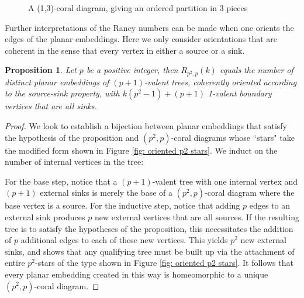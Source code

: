 \documentclass[documentfleqn,12pt]{amsart}
\newtheorem{proposition}[theorem]{Proposition}
\begin{document}
\begin{figure}[h!]
\centering
{}
\caption{A (1,3)-coral diagram, giving an ordered partition in 3 pieces}
\label{fig: (1,r) coral diagram}
\end{figure}

Further interpretations of the Raney numbers can be made when one orients the edges of the planar embeddings.  Here we only consider orientations that are coherent in the sense that every vertex in either a source or a sink.

\begin{proposition}
\label{thm: raney interpretation p=r2}
Let $p$ be a positive integer, then $R_{p^2,p}(k)$ equals the number of distinct planar embeddings of $(p+1)$-valent trees, coherently oriented according to the source-sink property,  with $k(p^2-1) + (p+1)$ 1-valent boundary vertices that are all sinks.
\end{proposition}
\begin{proof}
We look to establish a bijection between planar embeddings that satisfy the hypothesis of the proposition and $(p^2,p)$-coral diagrams whose ``stars" take the modified form shown in Figure \ref{fig: oriented p2 stars}.  We induct on the number of internal vertices in the tree:

For the base step, notice that a $(p+1)$-valent tree with one internal vertex and $(p+1)$ external sinks is merely the base of a $(p^2,p)$-coral diagram where the base vertex is a source.  For the inductive step, notice that adding $p$ edges to an external sink produces $p$ new external vertices that are all sources.  If the resulting tree is to satisfy the hypotheses of the proposition, this necessitates the addition of $p$ additional edges to each of these new vertices.  This yields $p^2$ new external sinks, and shows that any qualifying tree must be built up via the attachment of entire $p^2$-stars of the type shown in Figure \ref{fig: oriented p2 stars}.  It follows that every planar embedding created in this way is homeomorphic to a unique $(p^2,p)$-coral diagram.
\end{proof}
\end{document}

